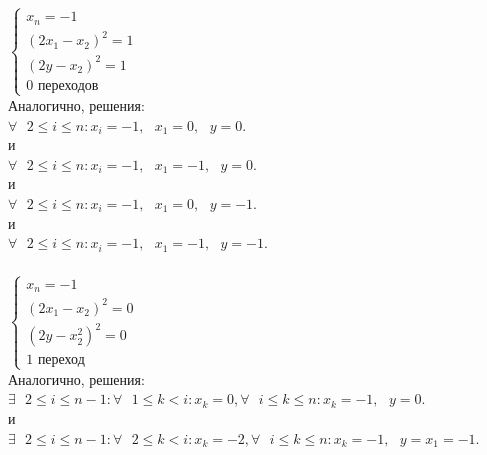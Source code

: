 \documentclass[12pt, a4paper]{article}
\begin{document}
{        \subsubsection{}
            $
                \begin{cases}
                    x_n=-1\\
                    (2x_1-x_2)^2=1\\
                    (2y-x_2)^2=1\\
                    0 \text{ переходов}
                \end{cases}
            $\\
            Аналогично, решения:\\
            $
            \forall \text{ } 2 \leq i \leq n : x_i=-1, \text{ } x_1 = 0, \text{ } y = 0.
            $\\ и \\
            $
            \forall \text{ } 2 \leq i \leq n : x_i=-1, \text{ } x_1 = -1, \text{ } y = 0.
            $\\ и \\
            $
            \forall \text{ } 2 \leq i \leq n : x_i=-1, \text{ } x_1 = 0, \text{ } y = -1.
            $\\ и \\
            $
            \forall \text{ } 2 \leq i \leq n : x_i=-1, \text{ } x_1 = -1, \text{ } y = -1.
            $
        \subsubsection{}
            $
                \begin{cases}
                    x_n=-1\\
                    (2x_1-x_2)^2=0\\
                    (2y-x_2^2)^2=0\\
                    1 \text{ переход}
                \end{cases}
            $\\
            Аналогично, решения:\\
            $
            \exists \text{ } 2\leq i \leq n-1 : \forall \text{ } 1 \leq k < i : x_k=0, \forall \text{ } i \leq k \leq n : x_k = -1, \text{ } y = 0. 
            $\\ и \\
            $
            \exists \text{ } 2\leq i \leq n-1 : \forall \text{ } 2 \leq k < i : x_k=-2, \forall \text{ } i \leq k \leq n : x_k = -1, \text{ } y = x_1 = -1. 
            $

}
\end{document}
